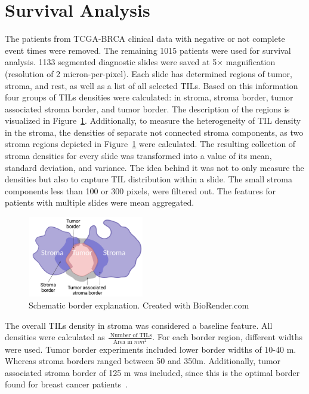 \section{Survival Analysis}
The patients from TCGA-BRCA clinical data with negative or not complete event times were removed. The remaining
1015 patients were used for survival analysis.
1133 segmented diagnostic slides were saved at 5$\times$ magnification (resolution of 2 micron-per-pixel). Each slide has determined regions of tumor, stroma,
and rest, as well as a list of all selected TILs. Based on this information four groups of TILs
densities were calculated: in stroma, stroma border, tumor associated stroma border,
and tumor border. The description of the regions is visualized in Figure~\ref*{fig:borders}.
Additionally, to measure the heterogeneity of TIL density in the stroma,
the densities of separate not connected stroma components, as two stroma regions depicted
in Figure~\ref*{fig:borders} were calculated. The resulting collection of stroma densities
for every slide was transformed into a value of its mean, standard deviation, and variance.
The idea behind it was not to only measure the densities but also to capture TIL distribution
within a slide.
The small stroma components less than 100 or 300 pixels, were filtered out.
The features for patients with multiple slides were mean aggregated.
\begin{figure}
    \centering
    \includegraphics[width=0.45\textwidth]{figures/survival/tils_scheme.png} 
    \caption{Schematic border explanation. Created with BioRender.com}
    \label{fig:borders} 
\end{figure}
The overall TILs density in stroma was considered a baseline feature.
All densities were calculated as $\frac{\textrm{ Number of TILs}}{\textrm{Area in } mm^2}$.
For each border region, different widths were used. Tumor border experiments included
lower border widths of 10-40 \textmu m. Whereas stroma borders ranged between 50
and 350\textmu m.
Additionally, tumor associated stroma border of 125 \textmu m was included, since this is
the optimal border found for breast cancer patients~\cite{thagaard2021automated}.
